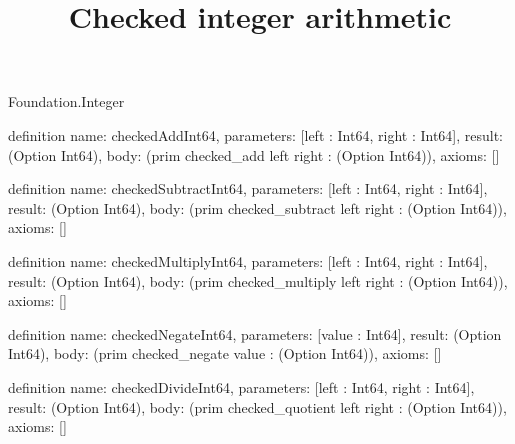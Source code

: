 \begin{lexlean}{Foundation.Integer}
\title{Checked integer arithmetic}
\begin{semanticmodule}
definition{
  name: checkedAddInt64,
  parameters: [left : Int64, right : Int64],
  result: (Option Int64),
  body: (prim checked_add left right : (Option Int64)),
  axioms: []
}

definition{
  name: checkedSubtractInt64,
  parameters: [left : Int64, right : Int64],
  result: (Option Int64),
  body: (prim checked_subtract left right : (Option Int64)),
  axioms: []
}

definition{
  name: checkedMultiplyInt64,
  parameters: [left : Int64, right : Int64],
  result: (Option Int64),
  body: (prim checked_multiply left right : (Option Int64)),
  axioms: []
}

definition{
  name: checkedNegateInt64,
  parameters: [value : Int64],
  result: (Option Int64),
  body: (prim checked_negate value : (Option Int64)),
  axioms: []
}

definition{
  name: checkedDivideInt64,
  parameters: [left : Int64, right : Int64],
  result: (Option Int64),
  body: (prim checked_quotient left right : (Option Int64)),
  axioms: []
}
\end{semanticmodule}
\end{lexlean}
